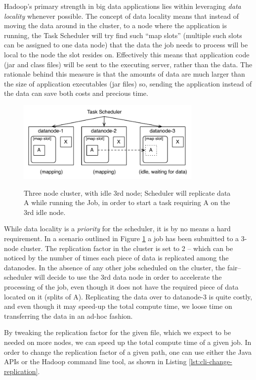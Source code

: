 Hadoop's primary strength in big data applications lies within leveraging \textit{data locality} whenever possible. The concept of data locality means that instead of moving the data around in the cluster, to a node where the application is running, the Task Scheduler will try find such ``map slots'' (multiple such slots can be assigned to one data node) that the data the job needs to process will be local to the node the slot resides on. Effectively this means that application code (jar and class files) will be sent to the executing server, rather than the data. The rationale behind this measure is that the amounts of data are much larger than the size of application executables (jar files) so, sending the application instead of the data can save both costs and precious time.


\begin{figure}[ch!]
  \centering
  \includegraphics[width=0.8\textwidth]{img/forced-data-replication.pdf}
  \label{fig:replication-ad-hoc}
  \caption{Three node cluster, with idle 3rd node; Scheduler will replicate data A while running the Job, in order to start a task requiring A on the 3rd idle node.}
\end{figure}


While data locality is a \textit{priority} for the scheduler, it is by no means a hard requirement. In a scenario outlined in Figure \ref{fig:replication-ad-hoc} a job has been submitted to a 3-node cluster. The replication factor in the cluster is set to 2 -- which can be noticed by the number of times each piece of data is replicated among the datanodes. In the absence of any other jobs scheduled on the cluster, the fair--scheduler will decide to use the 3rd data node in order to accelerate the processing of the job, even though it does not have the required piece of data located on it (splits of A). Replicating the data over to datanode-3 is quite costly, and even though it may speed-up the total compute time, we loose time on transferring the data in an ad-hoc fashion.

\newpage
By tweaking the replication factor for the given file, which we expect to be needed on more nodes, we can speed up the total compute time of a given job. In order to change the replication factor of a given path, one can use either the Java APIs or the Hadoop command line tool, as shown in Listing \ref{lst:cli-change-replication}.


